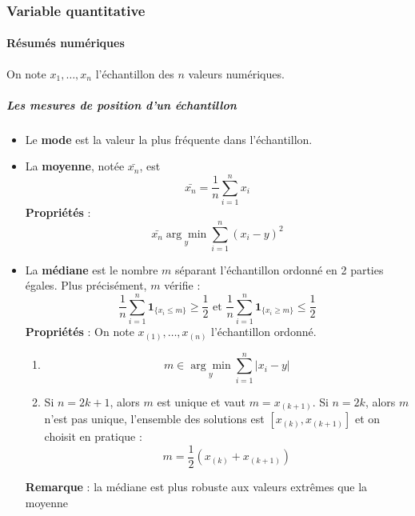 \subsubsection{Variable quantitative}
\paragraph{Résumés numériques}
On note $x_{1},\dots,x_{n}$ l'échantillon des $n$ valeurs numériques.
\subparagraph{Les mesures de position d'un échantillon}
\begin{itemize}
\item Le \textbf{mode} est la valeur la plus fréquente dans l'échantillon.
\item La \textbf{moyenne}, notée $\bar{x_{n}}$, est
$$\bar{x_{n}} = \frac{1}{n} \sum_{i = 1}^{n} x_{i}$$
\textbf{Propriétés} :
$$ \bar{x_{n}} \underset{y}{\arg\min} \sum_{i=1}^{n} (x_{i}-y)^{2}$$
\item La \textbf{médiane} est le nombre $m$ séparant l'échantillon ordonné en 2 parties égales. Plus précisément, $m$ vérifie :
$$ \frac{1}{n} \sum_{i=1}^{n} \mathbf{1}_{\{x_{i}\leq m\}} \geq \frac{1}{2} \textrm{ et }\frac{1}{n} \sum_{i=1}^{n} \mathbf{1}_{\{x_{i}\geq m\}} \leq \frac{1}{2} $$
\textbf{Propriétés} :
On note $x_{(1)},\dots,x_{(n)}$ l'échantillon ordonné.
\begin{enumerate}
\item 
$$ m \in \underset{y}{\arg\min} \sum_{i=1}^{n} |x_{i}-y|$$
\item Si $n = 2k+1$, alors $m$ est unique et vaut $m=x_{(k+1)}$. Si $n = 2k$, alors $m$ n'est pas unique, l'ensemble des solutions est $[x_{(k)},x_{(k+1)}]$ et on choisit en pratique : 
$$ m = \frac{1}{2}(x_{(k)} + x_{(k+1)})$$
\end{enumerate}
\textbf{Remarque} : la médiane est plus robuste aux valeurs extrêmes que la moyenne


\end{itemize}
